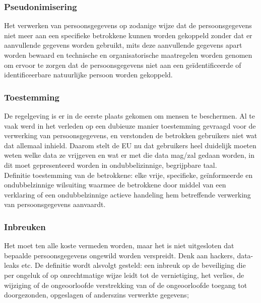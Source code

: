 \subsubsection{Pseudonimisering} 
Het verwerken van persoonsgegevens op zodanige wijze dat de persoonsgegevens niet meer aan een specifieke betrokkene kunnen worden gekoppeld zonder dat er aanvullende gegevens worden gebruikt, mits deze aanvullende gegevens apart worden bewaard en technische en organisatorische maatregelen worden genomen om ervoor te zorgen dat de persoonsgegevens niet aan een geïdentificeerde of identificeerbare natuurlijke persoon worden gekoppeld. 

\subsubsection{Toestemming} 
De regelgeving is er in de eerste plaats gekomen om mensen te beschermen. Al te vaak werd in het verleden op een dubieuze manier toestemming gevraagd voor de verwerking van persoonsgegevens, en verstonden de betrokken gebruikers niet wat dat allemaal inhield. Daarom stelt de EU nu dat gebruikers heel duidelijk moeten weten welke data ze vrijgeven en wat er met die data mag/zal gedaan worden, in dit moet gepresenteerd worden in ondubbelizinnige, begrijpbare taal. \\ Definitie toestemming van de betrokkene: elke vrije, specifieke, geïnformeerde en ondubbelzinnige wilsuiting waarmee de betrokkene door middel van een verklaring of een ondubbelzinnige actieve handeling hem betreffende verwerking van persoonsgegevens aanvaardt. 

\subsubsection{Inbreuken} 
Het moet ten alle koste vermeden worden, maar het is niet uitgesloten dat bepaalde persoonsgegevens ongewild worden verspreidt. Denk aan hackers, data-leaks etc. 
De definitie wordt alsvolgt gesteld: een inbreuk op de beveiliging die per ongeluk of op onrechtmatige wijze leidt tot de vernietiging, het verlies, de wijziging of de ongeoorloofde verstrekking van of de ongeoorloofde toegang tot doorgezonden, opgeslagen of anderszins verwerkte gegevens; 


